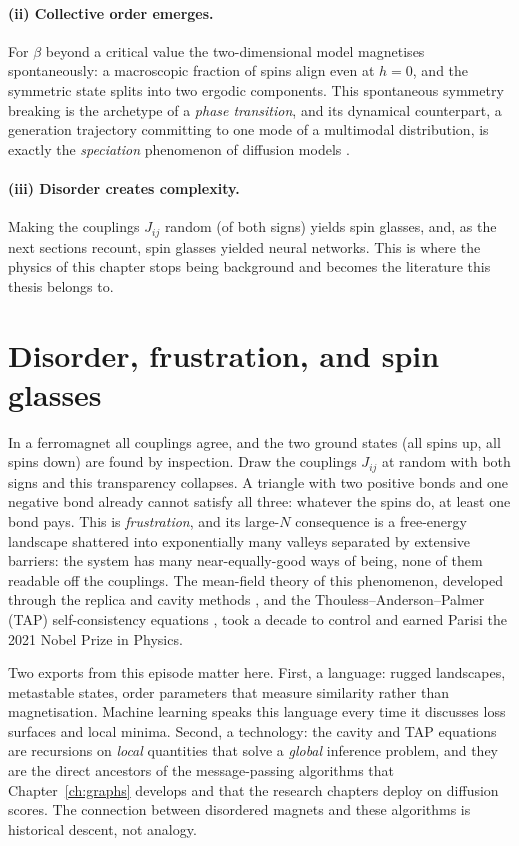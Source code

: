 \paragraph{(ii) Collective order emerges.} For $\beta$ beyond a critical
value the two-dimensional model magnetises spontaneously: a macroscopic
fraction of spins align even at $h = 0$, and the symmetric state splits
into two ergodic components. This spontaneous symmetry breaking is the
archetype of a \emph{phase transition}, and its dynamical counterpart, a
generation trajectory committing to one mode of a multimodal
distribution, is exactly the \emph{speciation} phenomenon of diffusion
models \citep{biroli2024dynamical, raya2023spontaneous}.

\paragraph{(iii) Disorder creates complexity.} Making the couplings
$J_{ij}$ random (of both signs) yields spin glasses, and, as the next
sections recount, spin glasses yielded neural networks. This is where the
physics of this chapter stops being background and becomes the
literature this thesis belongs to.

\section{Disorder, frustration, and spin glasses}\label{sec:spinglass}

In a ferromagnet all couplings agree, and the two ground states (all
spins up, all spins down) are found by inspection. Draw the couplings
$J_{ij}$ at random with both signs \citep{edwards1975theory,
sherrington1975solvable} and this transparency collapses. A triangle with
two positive bonds and one negative bond already cannot satisfy all
three: whatever the spins do, at least one bond pays. This is
\emph{frustration}, and its large-$N$ consequence is a free-energy
landscape shattered into exponentially many valleys separated by
extensive barriers: the system has many near-equally-good ways of being,
none of them readable off the couplings. The mean-field theory of this
phenomenon, developed through the replica and cavity methods
\citep{mezard1987spin}, and the Thouless--Anderson--Palmer (TAP)
self-consistency equations \citep{thouless1977solution}, took a decade to
control and earned Parisi the 2021 Nobel Prize in Physics.

Two exports from this episode matter here. First, a language: rugged
landscapes, metastable states, order parameters that measure similarity
rather than magnetisation. Machine learning speaks this language every
time it discusses loss surfaces and local minima. Second, a technology:
the cavity and TAP equations are recursions on \emph{local} quantities
that solve a \emph{global} inference problem, and they are the direct
ancestors of the message-passing algorithms \citep{mezard2009information,
zdeborova2016statistical, krzakala2024statphys} that
Chapter~\ref{ch:graphs} develops and that the research chapters deploy on
diffusion scores. The connection between disordered magnets and these
algorithms is historical descent, not analogy.

